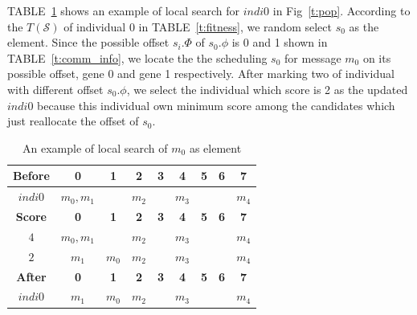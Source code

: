 \documentclass[journal]{IEEEtran}
\newcommand{\calS}{\mathcal{S}}
\begin{document}
TABLE~\ref{t:local} shows an example of local search for $indi0$ in Fig~\ref{t:pop}.
According to the $T(\calS)$ of individual 0 in TABLE~\ref{t:fitness},
 we random select $s_0$ as the element. 
Since the possible offset $s_i.\Phi$ of $s_0.\phi$ is 0 and 1 shown in TABLE~\ref{t:comm_info},
  we locate the the scheduling $s_0$ for message $m_0$ on its possible offset, gene 0 and gene 1 respectively.
After marking two of individual with different offset $s_0.\phi$,
 we select the individual which score is 2 as the updated $indi0$ because this individual own minimum score among the candidates which just reallocate the offset of $s_0$.
\begin{table}[!t]
	\renewcommand{\arraystretch}{1.3}
	\newcommand{\tabincell}[2]{\begin{tabular}{@{}#1@{}}#2\end{tabular}}
	\caption{An example of local search of $m_0$ as element}
	\label{t:local}
	\centering
	\begin{tabular}{|c||c||c||c||c||c||c||c||c|}
		\hline
		\textbf{Before}& 
		\textbf{0} & 
		\textbf{1} & 
		\textbf{2} & 
		\textbf{3} &
		\textbf{4} & 
		\textbf{5} & 
		\textbf{6} & 
		\textbf{7} \\		
		\hline
		$indi0$	&$m_0,m_1$&	&$m_2$&	&$m_3$& & &$m_4$\\		
		\hline
		\hline
		\textbf{Score}& 
		\textbf{0} & 
		\textbf{1} & 
		\textbf{2} & 
		\textbf{3} &
		\textbf{4} & 
		\textbf{5} & 
		\textbf{6} & 
		\textbf{7} \\		
		\hline
		$4$	&$m_0,m_1$&	&$m_2$&	&$m_3$& & &$m_4$\\
		\hline
		$2$	&$m_1$&$m_0$&$m_2$&	&$m_3$& & &$m_4$\\		
		\hline
		\hline		
		\textbf{After}& 
		\textbf{0} & 
		\textbf{1} & 
		\textbf{2} & 
		\textbf{3} &
		\textbf{4} & 
		\textbf{5} & 
		\textbf{6} & 
		\textbf{7} \\		
		\hline
		$indi0$&$m_1$&$m_0$&$m_2$&	&$m_3$& & &$m_4$\\		
		\hline
	\end{tabular}
\end{table}
\end{document}
